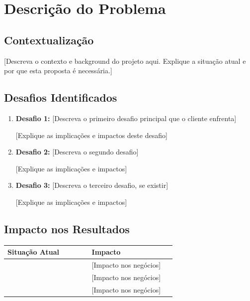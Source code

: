 \section{Descrição do Problema}

\subsection{Contextualização}

[Descreva o contexto e background do projeto aqui. Explique a situação atual e por que esta proposta é necessária.]

\vskip 1cm

\subsection{Desafios Identificados}

\begin{enumerate}
    \item \textbf{Desafio 1:} [Descreva o primeiro desafio principal que o cliente enfrenta]
    
    [Explique as implicações e impactos deste desafio]
    
    \item \textbf{Desafio 2:} [Descreva o segundo desafio]
    
    [Explique as implicações e impactos]
    
    \item \textbf{Desafio 3:} [Descreva o terceiro desafio, se existir]
    
    [Explique as implicações e impactos]
\end{enumerate}

\vskip 1cm

\subsection{Impacto nos Resultados}

\bigskip

\begin{tabular}{|p{0.45\linewidth}|p{0.45\linewidth}|}
    \hline
    \textbf{Situação Atual} & \textbf{Impacto} \\
    \hline
    [Desafio 1] & [Impacto nos negócios] \\
    \hline
    [Desafio 2] & [Impacto nos negócios] \\
    \hline
    [Desafio 3] & [Impacto nos negócios] \\
    \hline
\end{tabular}

\bigskip
